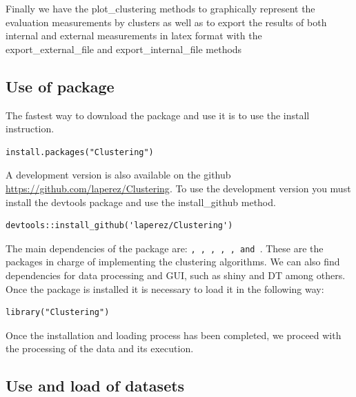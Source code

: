 Finally we have the plot\_clustering methods to graphically represent the evaluation measurements by clusters as well as to export the results of both internal and external measurements in latex format with the export\_external\_file and export\_internal\_file methods

\subsection{Use of  package}

The fastest way to download the  package and use it is to use the install instruction.

\begin{verbatim}
install.packages("Clustering")
\end{verbatim}

A development version is also available on the github \url{https://github.com/laperez/Clustering}. To use the development version you must install the devtools package and use the install\_github method.

\begin{verbatim}
devtools::install_github('laperez/Clustering')
\end{verbatim}

The main dependencies of the   package are: \texttt{, , , , ,  and }. These are the packages in charge of implementing the clustering algorithms. We can also find dependencies for data processing and GUI, such as shiny and DT among others. Once the package is installed it is necessary to load it in the following way:

\begin{verbatim}
library("Clustering")
\end{verbatim}

Once the installation and loading process has been completed, we proceed with the processing of the data and its execution.

\subsection*{Use and load of datasets}

